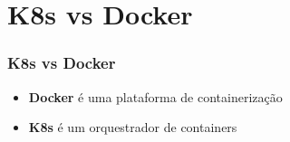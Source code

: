 \section{K8s vs Docker}

\begin{frame}
\frametitle{K8s vs Docker}
\begin{itemize}
	\item \textbf{Docker} é uma plataforma de containerização
	\item \textbf{K8s} é um orquestrador de containers
\end{itemize}
\end{frame}

